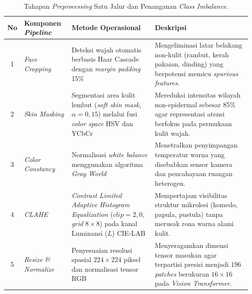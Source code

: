 \begin{table}[!htbp]
    \centering
    \caption{Tahapan \textit{Preprocessing} Satu Jalur dan Penanganan \textit{Class Imbalance}.}
    \label{tab:tahap_preprocessing}
    \footnotesize
    \renewcommand{\arraystretch}{1.25}
    \begin{tabularx}{\textwidth}{c >{\raggedright\arraybackslash}p{3.0cm} >{\raggedright\arraybackslash}X >{\raggedright\arraybackslash}X}
        \toprule
        \textbf{No} & \textbf{Komponen \textit{Pipeline}} & \textbf{Metode Operasional}                                                                                                      & \textbf{Deskripsi}                                                                                                               \\
        \midrule
        1           & \textit{Face Cropping}         & Deteksi wajah otomatis berbasis Haar Cascade dengan \textit{margin padding} 15\%                                         & Mengeliminasi latar belakang non-kulit (rambut, kerah pakaian, dinding) yang berpotensi memicu \textit{spurious features}.       \\
        \midrule
        2           & \textit{Skin Masking}          & Segmentasi area kulit lembut (\textit{soft skin mask}, $\alpha = 0,15$) melalui fusi \textit{color space} HSV dan YCbCr                             & Mereduksi intensitas wilayah non-epidermal sebesar 85\% agar representasi atensi berfokus pada permukaan kulit wajah.            \\
        \midrule
        3           & \textit{Color Constancy}       & Normalisasi \textit{white balance} menggunakan algoritma \textit{Gray World}                                                         & Menetralkan penyimpangan temperatur warna yang disebabkan sensor kamera dan pencahayaan ruangan heterogen.                       \\
        \midrule
        4           & \textit{CLAHE}                 & \textit{Contrast Limited Adaptive Histogram Equalization} ($clip=2,0$, \textit{grid} $8\times8$) pada kanal Luminansi ($L$) CIE-LAB          & Mempertajam visibilitas struktur mikrolesi (komedo, papula, pustula) tanpa merusak rona warna alami kulit.                      \\
        \midrule
        5           & \textit{Resize \& Normalize}   & Penyesuaian resolusi spasial $224\times224$ piksel dan normalisasi tensor RGB                                                    & Menyeragamkan dimensi tensor masukan agar terpartisi presisi menjadi 196 \textit{patches} berukuran $16\times16$ pada \textit{Vision Transformer}. \\

\end{tabularx}
\end{table}
